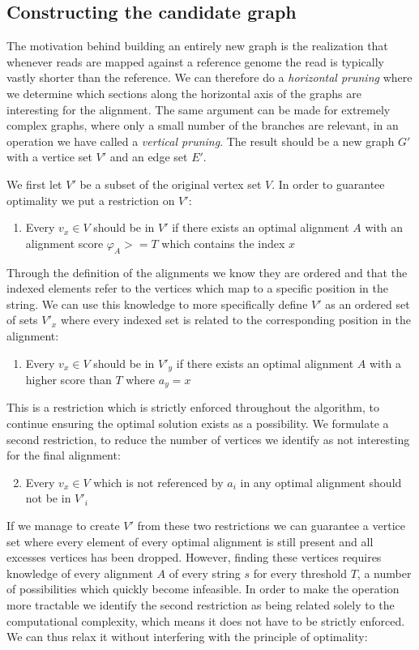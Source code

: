 \documentclass[thesis.tex]{subfiles}
\begin{document}
\subsection{Constructing the candidate graph}
The motivation behind building an entirely new graph is the realization that whenever reads are mapped against a reference genome the read is typically vastly shorter than the reference. We can therefore do a \textit{horizontal pruning} where we determine which sections along the horizontal axis of the graphs are interesting for the alignment. The same argument can be made for extremely complex graphs, where only a small number of the branches are relevant, in an operation we have called a \textit{vertical pruning}. The result should be a new graph $G'$ with a vertice set $V'$ and an edge set $E'$.\\
\par\noindent
We first let $V'$ be a subset of the original vertex set $V$. In order to guarantee optimality we put a restriction on $V'$:
\begin{enumerate}
  \item Every $v_x \in V$ should be in $V'$ if there exists an optimal alignment $A$ with an alignment score $\varphi_A >= T$ which contains the index $x$
\end{enumerate}
Through the definition of the alignments we know they are ordered and that the indexed elements refer to the vertices which map to a specific position in the string. We can use this knowledge to more specifically define $V'$ as an ordered set of sets $V'_x$ where every indexed set is related to the corresponding position in the alignment:
\begin{enumerate}
  \item Every $v_x \in V$ should be in $V'_y$ if there exists an optimal alignment $A$ with a higher score than $T$ where $a_y=x$
\end{enumerate}
This is a restriction which is strictly enforced throughout the algorithm, to continue ensuring the optimal solution exists as a possibility. We formulate a second restriction, to reduce the number of vertices we identify as not interesting for the final alignment:
\begin{enumerate}
  \setcounter{enumi}{1}
  \item Every $v_x \in V$ which is not referenced by $a_i$ in any optimal alignment should not be in $V'_i$
\end{enumerate}
If we manage to create $V'$ from these two restrictions we can guarantee a vertice set where every element of every optimal alignment is still present and all excesses vertices has been dropped. However, finding these vertices requires knowledge of every alignment $A$ of every string $s$ for every threshold $T$, a number of possibilities which quickly become infeasible. In order to make the operation more tractable we identify the second restriction as being related solely to the computational complexity, which means it does not have to be strictly enforced. We can thus relax it without interfering with the principle of optimality:
\end{document}
